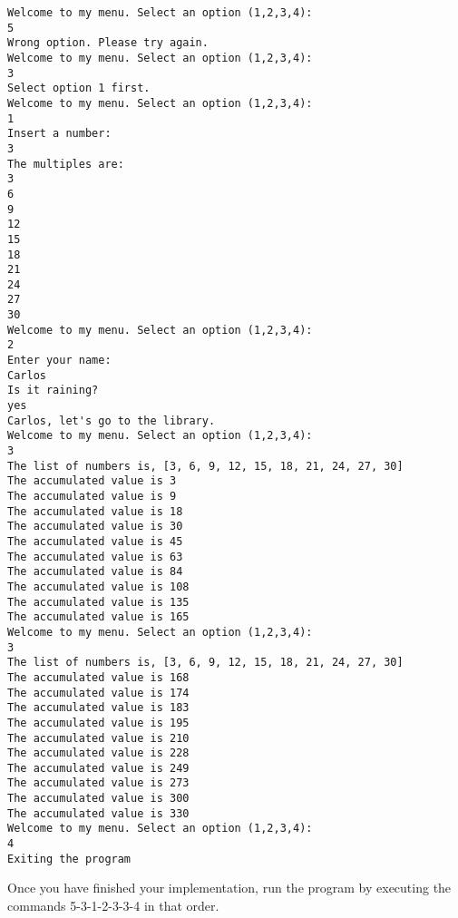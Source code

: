 \documentclass[11pt]{article}
\begin{document}
    \begin{Verbatim}[commandchars=\\\{\}]
Welcome to my menu. Select an option (1,2,3,4):
5
Wrong option. Please try again.
Welcome to my menu. Select an option (1,2,3,4):
3
Select option 1 first.
Welcome to my menu. Select an option (1,2,3,4):
1
Insert a number:
3
The multiples are:
3
6
9
12
15
18
21
24
27
30
Welcome to my menu. Select an option (1,2,3,4):
2
Enter your name:
Carlos
Is it raining?
yes
Carlos, let's go to the library.
Welcome to my menu. Select an option (1,2,3,4):
3
The list of numbers is, [3, 6, 9, 12, 15, 18, 21, 24, 27, 30]
The accumulated value is 3
The accumulated value is 9
The accumulated value is 18
The accumulated value is 30
The accumulated value is 45
The accumulated value is 63
The accumulated value is 84
The accumulated value is 108
The accumulated value is 135
The accumulated value is 165
Welcome to my menu. Select an option (1,2,3,4):
3
The list of numbers is, [3, 6, 9, 12, 15, 18, 21, 24, 27, 30]
The accumulated value is 168
The accumulated value is 174
The accumulated value is 183
The accumulated value is 195
The accumulated value is 210
The accumulated value is 228
The accumulated value is 249
The accumulated value is 273
The accumulated value is 300
The accumulated value is 330
Welcome to my menu. Select an option (1,2,3,4):
4
Exiting the program

    \end{Verbatim}

    Once you have finished your implementation, run the program by executing
the commands 5-3-1-2-3-3-4 in that order.


    
    
    
    
\end{document}
